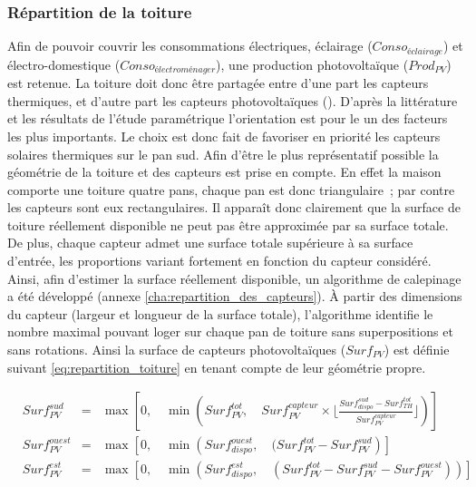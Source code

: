 \subsubsection{Répartition de la toiture} %
\label{ssub:repartition_de_la_toiture}
Afin de pouvoir couvrir les consommations électriques, éclairage ($Conso_{éclairage}$) et
électro-domestique ($Conso_{électroménager}$), une production photovoltaïque ($Prod_{PV}$)
est retenue. La toiture doit donc être partagée entre d’une part les capteurs thermiques, et
d’autre part les capteurs photovoltaïques (). D’après la littérature et les résultats
de l’étude paramétrique l’orientation est pour le  un des facteurs les plus
importants. Le choix est donc fait de favoriser en priorité les capteurs solaires
thermiques sur le pan sud. Afin d’être le plus représentatif possible la géométrie
de la toiture et des capteurs est prise en compte.
En effet la maison comporte une toiture quatre pans, chaque pan est donc triangulaire~; par
contre les capteurs sont eux rectangulaires. Il apparaît donc clairement que la surface
de toiture réellement disponible ne peut pas être approximée par sa surface totale.
De plus, chaque capteur admet une surface totale supérieure à sa surface d’entrée,
les proportions variant fortement en fonction du capteur considéré.
Ainsi, afin d’estimer la surface réellement disponible, un algorithme de calepinage
a été développé (annexe \ref{cha:repartition_des_capteurs}). À partir des dimensions
du capteur (largeur et longueur de la surface totale), l’algorithme identifie le
nombre maximal pouvant loger sur chaque pan de toiture sans superpositions et sans rotations.
Ainsi la surface de capteurs photovoltaïques ($Surf_{PV}$) est définie suivant
\eqref{eq:repartition_toiture} en tenant compte de leur géométrie propre.

\begin{equation}\label{eq:repartition_toiture}
  \begin{aligned}
    &Surf_{PV}^{sud}   &=& \max\left[0,\quad \min \left(Surf_{PV}^{tot},\quad Surf_{PV}^{capteur} \times
                                                      \Bigg\lfloor\frac{Surf_{dispo}^{sud} - Surf_{TH}^{tot}}{Surf_{PV}^{capteur}}\Bigg\rfloor\right)
                                   \right] \\
    &Surf_{PV}^{ouest} &=& \max \left[0,\quad \min\left(Surf_{dispo}^{ouest},\quad
                                                      (Surf_{PV}^{tot} - Surf_{PV}^{sud}\right)
                                    \right] \\
    &Surf_{PV}^{est} &=& \max \left[0,\quad \min\left(Surf_{dispo}^{est},\quad
                                                    (Surf_{PV}^{tot} - Surf_{PV}^{sud} - Surf_{PV}^{ouest}) \right) \right] \\
  \end{aligned}
\end{equation}

